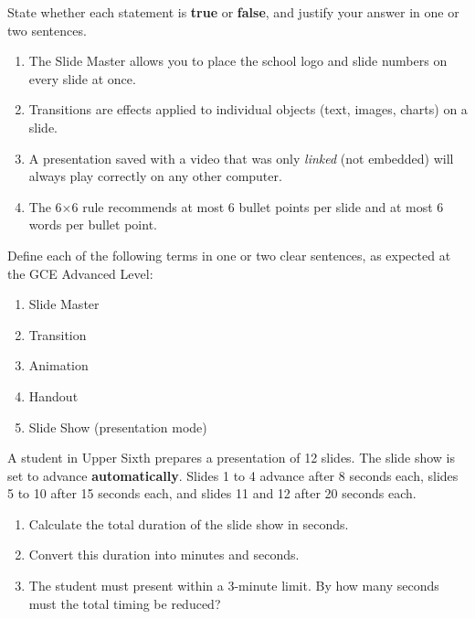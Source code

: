 \documentclass[11pt]{article}
\newcounter{popsec}
\newcounter{popsub}
\newcommand{\courssub}[1]{%
  \stepcounter{popsub}%
  \par\vspace{9pt}\noindent{\popxbold\fontsize{11.5}{13}\selectfont\color{popink}{\color{poporange}\thepopsec.\thepopsub}\hspace{6pt}#1}\par\nopagebreak\vspace{4pt}
}
\begin{document}
\begin{exercice}
State whether each statement is \textbf{true} or \textbf{false}, and justify your answer in one or two sentences.
\begin{enumerate}
\item The Slide Master allows you to place the school logo and slide numbers on every slide at once.
\item Transitions are effects applied to individual objects (text, images, charts) on a slide.
\item A presentation saved with a video that was only \emph{linked} (not embedded) will always play correctly on any other computer.
\item The 6$\times$6 rule recommends at most 6 bullet points per slide and at most 6 words per bullet point.
\end{enumerate}
\end{exercice}

\begin{exercice}
Define each of the following terms in one or two clear sentences, as expected at the GCE Advanced Level:
\begin{enumerate}
\item Slide Master
\item Transition
\item Animation
\item Handout
\item Slide Show (presentation mode)
\end{enumerate}
\end{exercice}

\begin{exercice}
A student in Upper Sixth prepares a presentation of 12 slides. The slide show is set to advance \textbf{automatically}. Slides 1 to 4 advance after 8 seconds each, slides 5 to 10 after 15 seconds each, and slides 11 and 12 after 20 seconds each.
\begin{enumerate}
\item Calculate the total duration of the slide show in seconds.
\item Convert this duration into minutes and seconds.
\item The student must present within a 3-minute limit. By how many seconds must the total timing be reduced?
\end{enumerate}
\end{exercice}

\courssub{I practise}
\end{document}
